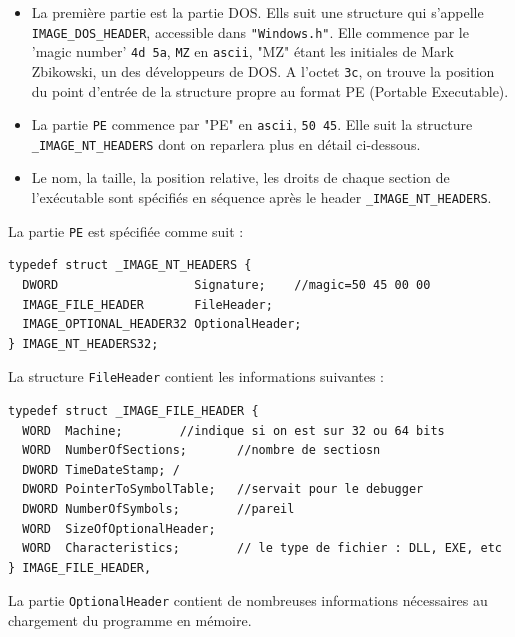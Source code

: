 \documentclass{book}
\newcommand{\code}[1]{\texttt{#1}}
\begin{document}
\begin{itemize}
	\item La première partie est la partie DOS. Ells suit une structure qui s'appelle \code{IMAGE\_DOS\_HEADER}, accessible dans \code{"Windows.h"}. Elle commence par le 'magic number' \code{4d 5a}, \code{MZ} en \code{ascii}, "MZ" étant les initiales de Mark Zbikowski, un des développeurs de DOS.  A l'octet \code{3c}, on trouve la position du point d'entrée de la structure propre au format PE (Portable Executable).
	\item La partie \code{PE} commence par "PE" en \code{ascii}, \code{50 45}. Elle suit la structure \code{\_IMAGE\_NT\_HEADERS} dont on reparlera plus en détail ci-dessous.
	\item Le nom, la taille, la position relative, les droits de chaque section de l'exécutable sont spécifiés en séquence  après le header \code{\_IMAGE\_NT\_HEADERS}. 
\end{itemize}

La partie \code{PE} est spécifiée comme suit : %
\begin{verbatim}
typedef struct _IMAGE_NT_HEADERS {
  DWORD                   Signature;	//magic=50 45 00 00
  IMAGE_FILE_HEADER       FileHeader;	
  IMAGE_OPTIONAL_HEADER32 OptionalHeader;
} IMAGE_NT_HEADERS32;
\end{verbatim} 

 La structure \code{FileHeader} contient les informations suivantes : 

\begin{verbatim}
typedef struct _IMAGE_FILE_HEADER {
  WORD  Machine;		//indique si on est sur 32 ou 64 bits
  WORD  NumberOfSections;       //nombre de sectiosn
  DWORD TimeDateStamp; /
  DWORD PointerToSymbolTable;   //servait pour le debugger
  DWORD NumberOfSymbols;        //pareil
  WORD  SizeOfOptionalHeader;
  WORD  Characteristics;        // le type de fichier : DLL, EXE, etc
} IMAGE_FILE_HEADER,
\end{verbatim}

La partie \code{OptionalHeader} contient de nombreuses informations nécessaires au chargement du programme en mémoire. 
\end{document}

